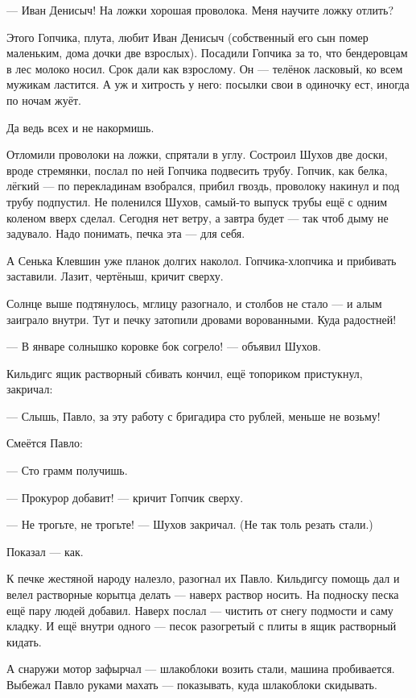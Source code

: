 --- Иван Денисыч! На ложки хорошая проволока. Меня научите ложку отлить?

Этого Гопчика, плута, любит Иван Денисыч (собственный его сын помер маленьким, дома дочки две
взрослых). Посадили Гопчика за то, что бендеровцам в лес молоко носил. Срок дали как
взрослому. Он --- телёнок ласковый, ко всем мужикам ластится. А уж и хитрость у него: посылки
свои в одиночку ест, иногда по ночам жуёт.

Да ведь всех и не накормишь.

Отломили проволоки на ложки, спрятали в углу. Состроил Шухов две доски, вроде стремянки,
послал по ней Гопчика подвесить трубу. Гопчик, как белка, лёгкий --- по перекладинам
взобрался, прибил гвоздь, проволоку накинул и под трубу подпустил. Не поленился Шухов,
самый-то выпуск трубы ещё с одним коленом вверх сделал. Сегодня нет ветру, а завтра будет ---
так чтоб дыму не задувало. Надо понимать, печка эта --- для себя.

А Сенька Клевшин уже планок долгих наколол. Гопчика-хлопчика и прибивать заставили. Лазит,
чертёныш, кричит сверху.

Солнце выше подтянулось, мглицу разогнало, и столбов не стало --- и алым заиграло внутри. Тут и
печку затопили дровами ворованными. Куда радостней!

--- В январе солнышко коровке бок согрело! --- объявил Шухов.

Кильдигс ящик растворный сбивать кончил, ещё топориком пристукнул, закричал:

--- Слышь, Павло, за эту работу с бригадира сто рублей, меньше не возьму!

Смеётся Павло:

--- Сто грамм получишь.

--- Прокурор добавит! --- кричит Гопчик сверху.

--- Не трогьте, не трогьте! --- Шухов закричал. (Не так толь резать стали.)

Показал --- как.

К печке жестяной народу налезло, разогнал их Павло. Кильдигсу помощь дал и велел растворные
корытца делать --- наверх раствор носить. На подноску песка ещё пару людей добавил. Наверх
послал --- чистить от снегу подмости и саму кладку. И ещё внутри одного --- песок разогретый с
плиты в ящик растворный кидать.

А снаружи мотор зафырчал --- шлакоблоки возить стали, машина пробивается. Выбежал Павло
руками махать --- показывать, куда шлакоблоки скидывать.

